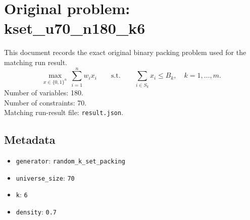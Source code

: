 \documentclass[11pt]{article}
\begin{document}
\section*{Original problem: kset\_u70\_n180\_k6}
This document records the exact original binary packing problem used for the matching run result.
\[
\max_{x\in\{0,1\}^n}\ \sum_{i=1}^n w_i x_i
\qquad\text{s.t.}\qquad
\sum_{i\in S_k} x_i \le B_k,\quad k=1,\dots,m.
\]
Number of variables: 180.\\
Number of constraints: 70.\\
Matching run-result file: \texttt{result.json}.
\subsection*{Metadata}
\begin{itemize}
\item \texttt{generator}: \texttt{random\_k\_set\_packing}
\item \texttt{universe\_size}: \texttt{70}
\item \texttt{k}: \texttt{6}
\item \texttt{density}: \texttt{0.7}
\end{itemize}
\end{document}
